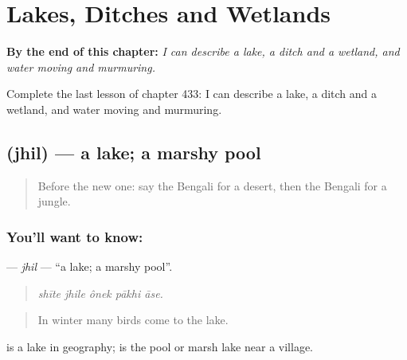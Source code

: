 
\chapter{Lakes, Ditches and Wetlands}
\label{ch:bn-lakes-ditches-and-wetlands}

\begin{chapteropening}
\textbf{By the end of this chapter:} \emph{I can describe a lake, a ditch and a wetland, and water moving and murmuring.}

Complete the last lesson of chapter 433: I can describe a lake, a ditch and a wetland, and water moving and murmuring.
\end{chapteropening}

\section[\texorpdfstring{\bn{ঝিল} (jhil)}{ঝিল (jhil)}]{ (jhil) — a lake; a marshy pool}

\label{lesson:BN-C433-jhil}



\begin{quote}
Before the new one: say the Bengali for a desert, then the Bengali for a jungle.
\end{quote}

\subsection*{You'll want to know: }
\textbf{} — \emph{jhil} — \textquotedblleft{}a lake; a marshy pool\textquotedblright{}.

\begin{quote}
    
\end{quote}

\begin{quote}
\emph{shīte jhile ônek pākhi āse.}
\end{quote}

\begin{quote}
In winter many birds come to the lake.
\end{quote}

 is a lake in geography;  is the pool or marsh lake near a village.

